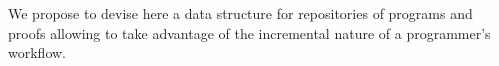 \documentclass[preprint]{sigplanconf}
\begin{document}
We propose to devise here a data structure for repositories of
programs and proofs allowing to take advantage of the incremental
nature of a programmer's workflow.



\end{document}
